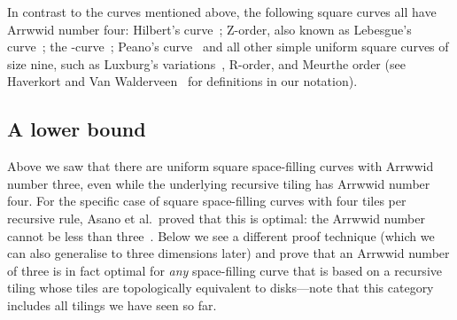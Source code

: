 \documentclass[11pt,a4paper]{article}
\begin{document}
\enlargethispage\baselineskip
In contrast to the curves mentioned above, the following square curves all have Arrwwid number four: Hilbert's curve~\cite{Hilbert1891}; Z-order, also known as Lebesgue's curve~\cite{Lebesgue1904}; the -curve~\cite{Wierum2002}; Peano's curve~\cite{Peano1890} and all other simple uniform square curves of size nine, such as Luxburg's variations~\cite{Luxburg1998}, R-order, and Meurthe order (see Haverkort and Van Walderveen~\cite{Haverkort2009} for definitions in our notation).

\subsection{A lower bound}
Above we saw that there are uniform square space-filling curves with Arrwwid number three, even while the underlying recursive tiling has Arrwwid number four. For the specific case of square space-filling curves with four tiles per recursive rule, Asano et al.\ proved that this is optimal: the Arrwwid number cannot be less than three~\cite{Asano1997}. Below we see a different proof technique (which we can also generalise to three dimensions later) and prove that an Arrwwid number of three is in fact optimal for \emph{any} space-filling curve that is based on a recursive tiling whose tiles are topologically equivalent to disks---note that this category includes all tilings we have seen so far.
\end{document}
